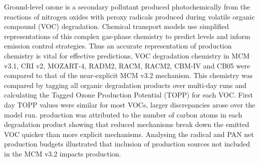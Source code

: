 Ground-level ozone is a secondary pollutant produced photochemically from the reactions of nitrogen oxides with peroxy radicals produced during volatile organic compound (VOC) degradation. 
Chemical transport models use simplified representations of this complex gas-phase chemistry to predict  levels and inform emission control strategies. 
Thus an accurate representation of  production chemistry is vital for effective predictions, VOC degradation chemistry in MCM v3.1, CRI v2, MOZART-4, RADM2, RACM, RACM2, CBM-IV and CB05 were compared to that of the near-explicit MCM v3.2 mechanism. 
This chemistry was compared by tagging all organic degradation products over multi-day runs and calculating the Tagged Ozone Production Potential (TOPP) for each VOC. 
First day TOPP values were similar for most VOCs, larger discrepancies arose over the model run. 
 production was attributed to the number of carbon atoms in each degradation product showing that reduced mechanisms break down the emitted VOC quicker than more explicit mechanisms. 
Analysing the radical and PAN net production budgets illustrated that inclusion of production sources not included in the MCM v3.2 impacts  production.
